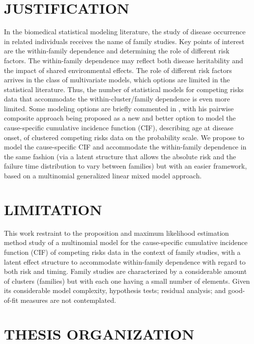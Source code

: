 \section{JUSTIFICATION}

In the biomedical statistical modeling literature, the study of disease
occurrence in related individuals receives the name of family studies.
Key points of interest are the within-family dependence and determining
the role of different risk factors. The within-family dependence may
reflect both disease heritability and the impact of shared environmental
effects. The role of different risk factors arrives in the class of
multivariate models, which options are limited in the statistical
literature. Thus, the number of statistical models for competing risks
data that accommodate the within-cluster/family dependence is even more
limited. Some modeling options are briefly commented in
, with his pairwise composite approach being
proposed as a new and better option to model the cause-specific
cumulative incidence function (CIF), describing age at disease onset, of
clustered competing risks data on the probability scale. We propose to
model the cause-specific CIF and accommodate the within-family
dependence in the same fashion (via a latent structure that allows the
absolute risk and the failure time distribution to vary between
families) but with an easier framework, based on a multinomial
generalized linear mixed model approach.

\section{LIMITATION}

This work restraint to the proposition and maximum likelihood estimation
method study of a multinomial model for the cause-specific cumulative
incidence function (CIF) of competing risks data in the context of
family studies, with a latent effect structure to accommodate
within-family dependence with regard to both risk and timing. Family
studies are characterized by a considerable amount of clusters
(families) but with each one having a small number of elements. Given
its considerable model complexity, hypothesis tests; residual analysis;
and good-of-fit measures are not contemplated.

\section{THESIS ORGANIZATION}

